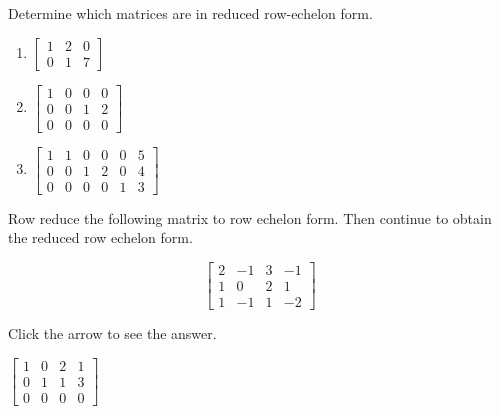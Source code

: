 \documentclass{ximera}
\begin{document}
\begin{problem}\label{prb:2.17} Determine which matrices are in reduced row-echelon form.

\begin{enumerate}
\item $\left[
\begin{array}{rrr}
1 & 2 & 0 \\
0 & 1 & 7
\end{array}
\right] $  

\item $\left[
\begin{array}{rrrr}
1 & 0 & 0 & 0 \\
0 & 0 & 1 & 2 \\
0 & 0 & 0 & 0
\end{array}
\right] $ 

\item $\left[
\begin{array}{rrrrrr}
1 & 1 & 0 & 0 & 0 & 5 \\
0 & 0 & 1 & 2 & 0 & 4 \\
0 & 0 & 0 & 0 & 1 & 3
\end{array}
\right] $ 

\end{enumerate}
\end{problem}

\begin{problem}\label{prb:2.18} Row reduce the following matrix to row echelon form. Then continue to obtain the reduced row echelon form.

\begin{equation*}
\left[
\begin{array}{rrrr}
2 & -1 & 3 & -1 \\
1 & 0 & 2 & 1 \\
1 & -1 & 1 & -2
\end{array}
\right]
\end{equation*}

Click the arrow to see the answer. 
\begin{expandable}
$\begin{bmatrix}1 & 0&2&1\\0&1&1&3\\0&0&0&0\end{bmatrix}$
\end{expandable}

\end{problem}
\end{document}

